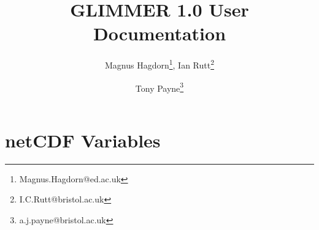 \newcommand{\dir}{ug}

\pagestyle{myheadings}



\title{GLIMMER 1.0 User Documentation}
\author{Magnus Hagdorn\thanks{Magnus.Hagdorn@ed.ac.uk}, Ian
Rutt\thanks{I.C.Rutt@bristol.ac.uk} \and Tony Payne\thanks{a.j.payne@bristol.ac.uk}}

\maketitle
\tableofcontents
\newpage


\appendix
\section{netCDF Variables}


